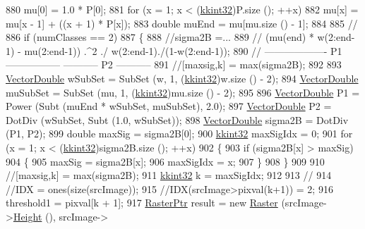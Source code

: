 \begin{DoxyCode}
{{{{{{{{{{{{{{{{{{{{{{{{{{{{{{{{{{{{{{{{{{{{{{{{{880   mu[0] = 1.0 * P[0];
881   \textcolor{keywordflow}{for}  (x = 1;  x < (\hyperlink{namespace_k_k_b_a8fa4952cc84fda1de4bec1fbdd8d5b1b}{kkint32})P.size ();  ++x)
882     mu[x] = mu[x - 1] + ((x + 1) * P[x]);
883   \textcolor{keywordtype}{double}  muEnd = mu[mu.size () - 1];
884   
885   \textcolor{comment}{//%
886   \textcolor{keywordflow}{if}  (numClasses == 2)
887   \{
888     \textcolor{comment}{//sigma2B =...}
889     \textcolor{comment}{//    (mu(end) * w(2:end-1) - mu(2:end-1)) .^2  ./  w(2:end-1)./(1-w(2:end-1));}
890     \textcolor{comment}{//    ------------------- P1 -----------------      ----------- P2 -----------}
891     \textcolor{comment}{//[maxsig,k] = max(sigma2B);}
892 
893     \hyperlink{namespace_k_k_b_a5906c207479607e5f450434095914a41}{VectorDouble}  wSubSet  = SubSet (w,  1, (\hyperlink{namespace_k_k_b_a8fa4952cc84fda1de4bec1fbdd8d5b1b}{kkint32})w.size  () - 2);
894     \hyperlink{namespace_k_k_b_a5906c207479607e5f450434095914a41}{VectorDouble}  muSubSet = SubSet (mu, 1, (\hyperlink{namespace_k_k_b_a8fa4952cc84fda1de4bec1fbdd8d5b1b}{kkint32})mu.size () - 2);
895    
896     \hyperlink{namespace_k_k_b_a5906c207479607e5f450434095914a41}{VectorDouble} P1 = Power (Subt (muEnd * wSubSet, muSubSet), 2.0);
897     \hyperlink{namespace_k_k_b_a5906c207479607e5f450434095914a41}{VectorDouble} P2 = DotDiv (wSubSet, Subt (1.0, wSubSet));
898     \hyperlink{namespace_k_k_b_a5906c207479607e5f450434095914a41}{VectorDouble} sigma2B = DotDiv (P1, P2);
899     \textcolor{keywordtype}{double}  maxSig = sigma2B[0];
900     \hyperlink{namespace_k_k_b_a8fa4952cc84fda1de4bec1fbdd8d5b1b}{kkint32} maxSigIdx = 0;
901     \textcolor{keywordflow}{for}  (x = 1;  x < (\hyperlink{namespace_k_k_b_a8fa4952cc84fda1de4bec1fbdd8d5b1b}{kkint32})sigma2B.size ();  ++x)
902     \{
903       \textcolor{keywordflow}{if}  (sigma2B[x] > maxSig)
904       \{
905         maxSig = sigma2B[x];
906         maxSigIdx = x;
907       \}
908     \}
909       
910     \textcolor{comment}{//[maxsig,k] = max(sigma2B);}
911     \hyperlink{namespace_k_k_b_a8fa4952cc84fda1de4bec1fbdd8d5b1b}{kkint32}  k = maxSigIdx;
912     
913     \textcolor{comment}{//%
914     \textcolor{comment}{//IDX = ones(size(srcImage));}
915     \textcolor{comment}{//IDX(srcImage>pixval(k+1)) = 2;}
916     threshold1 = pixval[k + 1];
917     \hyperlink{class_k_k_b_1_1_raster}{RasterPtr}  result = \textcolor{keyword}{new} \hyperlink{class_k_k_b_1_1_raster}{Raster} (srcImage->\hyperlink{class_k_k_b_1_1_raster_af8d10d15697d5b92fb9595c48b529feb}{Height} (), srcImage->
}}}}}}}}}}}}}}}}}}}}}}}}}}}}}}}}}}}}}}}}}}}}}}}}}}}
\end{DoxyCode}
